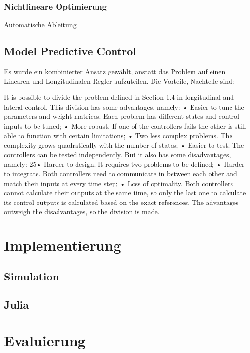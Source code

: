 \documentclass{like}
\begin{document}
 \subsection*{Nichtlineare Optimierung}
 

 
 Automatische Ableitung
 
 
 
 
\section{Model Predictive Control}
Es wurde ein kombinierter Ansatz gewählt, anstatt das Problem auf einen Linearen und Longitudinalen Regler aufzuteilen. Die Vorteile, Nachteile sind:

It is possible to divide the problem defined in Section 1.4 in longitudinal and lateral control. This division has
some advantages, namely:
• Easier to tune the parameters and weight matrices. Each problem has different states and control inputs to
be tuned;
• More robust. If one of the controllers fails the other is still able to function with certain limitations;
• Two less complex problems. The complexity grows quadratically with the number of states;
• Easier to test. The controllers can be tested independently.
But it also has some disadvantages, namely:
25• Harder to design. It requires two problems to be defined;
• Harder to integrate. Both controllers need to communicate in between each other and match their inputs at
every time step;
• Loss of optimality. Both controllers cannot calculate their outputs at the same time, so only the last one to
calculate its control outputs is calculated based on the exact references.
The advantages outweigh the disadvantages, so the division is made.

\chapter{Implementierung}

\section{Simulation}

\section{Julia}


\chapter{Evaluierung}
\end{document}
